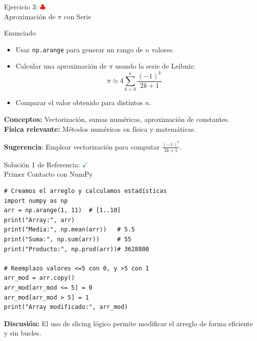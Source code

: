 \documentclass[10pt]{beamer}
\begin{document}
\begin{frame}{Ejercicio 3: \hfill \textcolor{red}{$\clubsuit$} \\ Aproximación de $\pi$ con Serie}
  \begin{block}{Enunciado}
    \begin{itemize}
      \item Usar \texttt{np.arange} para generar un rango de $n$ valores.
      \item Calcular una aproximación de $\pi$ usando la serie de Leibniz:
      \[
        \pi \approx 4 \sum_{k=0}^{n} \frac{(-1)^k}{2k+1}
      \]
      \item Comparar el valor obtenido para distintos $n$.
    \end{itemize}
  \end{block}
  	\textbf{Conceptos:} Vectorización, sumas numéricas, aproximación de constantes.\\
  	\textbf{Física relevante:} Métodos numéricos en física y matemáticas.
  
  	\textbf{Sugerencia}: Emplear vectorización para computar $\frac{(-1)^k}{2k+1}$.
\end{frame}

\begin{solutionblock}
\begin{frame}[fragile]{Solución 1 de Referencia: \hfill \textcolor{green}{$\checkmark$} \\ Primer Contacto con NumPy}
\begin{verbatim}
# Creamos el arreglo y calculamos estadísticas
import numpy as np
arr = np.arange(1, 11)  # [1..10]
print("Array:", arr)
print("Media:", np.mean(arr))   # 5.5
print("Suma:", np.sum(arr))     # 55
print("Producto:", np.prod(arr))# 3628800

# Reemplazo valores <=5 con 0, y >5 con 1
arr_mod = arr.copy()
arr_mod[arr_mod <= 5] = 0
arr_mod[arr_mod > 5] = 1
print("Array modificado:", arr_mod)
\end{verbatim}
	\textbf{Discusión:} El uso de slicing lógico permite modificar el arreglo de forma eficiente y sin bucles.
\end{frame}
\end{solutionblock}
\end{document}
